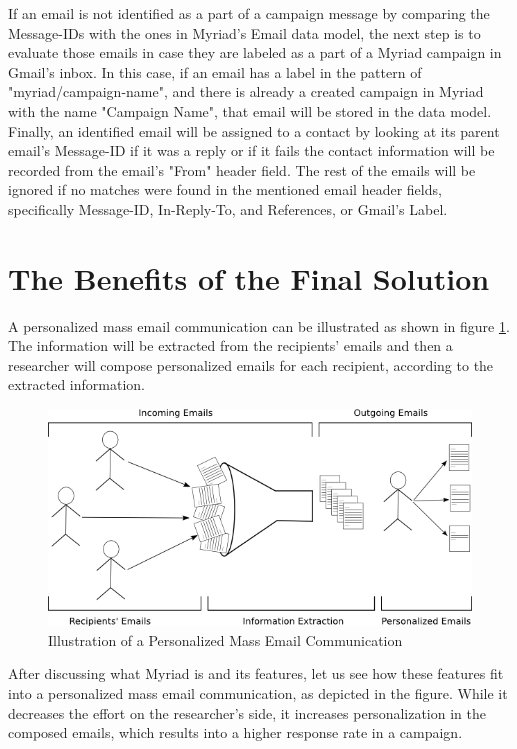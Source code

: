 If an email is not identified as a part of a campaign message by comparing the Message-IDs with the ones in Myriad's Email data model, the next step is to evaluate those emails in case they are labeled as a part of a Myriad campaign in Gmail's inbox. In this case, if an email has a label in the pattern of "myriad/campaign-name", and there is already a created campaign in Myriad with the name "Campaign Name", that email will be stored in the data model. Finally, an identified email will be assigned to a contact by looking at its parent email's Message-ID if it was a reply or if it fails the contact information will be recorded from the email's "From" header field. The rest of the emails will be ignored if no matches were found in the mentioned email header fields, specifically Message-ID, In-Reply-To, and References, or Gmail's Label.

\section{The Benefits of the Final Solution}
\label{sec:5.4:BeneFinaSolu}

A personalized mass email communication can be illustrated as shown in figure \ref{fig:drawingStatesOfEmailCommunication}. The information will be extracted from the recipients' emails and then a researcher will compose personalized emails for each recipient, according to the extracted information.

\begin{figure}[htbp]
	\centering
	\includegraphics[width=1.00\textwidth]{imgs/drawingStatesOfEmailCommunication.png}
	\caption[Illustration of a Personalized Mass Email Communication]{Illustration of a Personalized Mass Email Communication}
	\label{fig:drawingStatesOfEmailCommunication}
\end{figure}

After discussing what Myriad is and its features, let us see how these features fit into a personalized mass email communication, as depicted in the figure. While it decreases the effort on the researcher's side, it increases personalization in the composed emails, which results into a higher response rate in a campaign.

